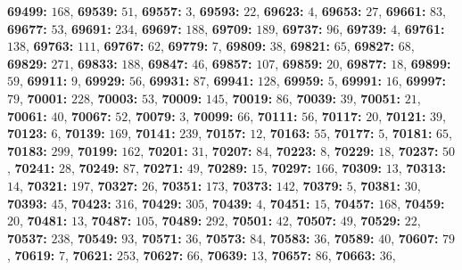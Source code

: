 \textsf{\bfseries 69499:} $168$, \textsf{\bfseries 69539:} $51$, \textsf{\bfseries 69557:} $3$, \textsf{\bfseries 69593:} $22$, \textsf{\bfseries 69623:} $4$, \textsf{\bfseries 69653:} $27$, \textsf{\bfseries 69661:} $83$, \textsf{\bfseries 69677:} $53$, \textsf{\bfseries 69691:} $234$, \textsf{\bfseries 69697:} $188$, \textsf{\bfseries 69709:} $189$, \textsf{\bfseries 69737:} $96$, \textsf{\bfseries 69739:} $4$, \textsf{\bfseries 69761:} $138$, \textsf{\bfseries 69763:} $111$, \textsf{\bfseries 69767:} $62$, \textsf{\bfseries 69779:} $7$, \textsf{\bfseries 69809:} $38$, \textsf{\bfseries 69821:} $65$, \textsf{\bfseries 69827:} $68$, \textsf{\bfseries 69829:} $271$, \textsf{\bfseries 69833:} $188$, \textsf{\bfseries 69847:} $46$, \textsf{\bfseries 69857:} $107$, \textsf{\bfseries 69859:} $20$, \textsf{\bfseries 69877:} $18$, \textsf{\bfseries 69899:} $59$, \textsf{\bfseries 69911:} $9$, \textsf{\bfseries 69929:} $56$, \textsf{\bfseries 69931:} $87$, \textsf{\bfseries 69941:} $128$, \textsf{\bfseries 69959:} $5$, \textsf{\bfseries 69991:} $16$, \textsf{\bfseries 69997:} $79$, \textsf{\bfseries 70001:} $228$, \textsf{\bfseries 70003:} $53$, \textsf{\bfseries 70009:} $145$, \textsf{\bfseries 70019:} $86$, \textsf{\bfseries 70039:} $39$, \textsf{\bfseries 70051:} $21$, \textsf{\bfseries 70061:} $40$, \textsf{\bfseries 70067:} $52$, \textsf{\bfseries 70079:} $3$, \textsf{\bfseries 70099:} $66$, \textsf{\bfseries 70111:} $56$, \textsf{\bfseries 70117:} $20$, \textsf{\bfseries 70121:} $39$, \textsf{\bfseries 70123:} $6$, \textsf{\bfseries 70139:} $169$, \textsf{\bfseries 70141:} $239$, \textsf{\bfseries 70157:} $12$, \textsf{\bfseries 70163:} $55$, \textsf{\bfseries 70177:} $5$, \textsf{\bfseries 70181:} $65$, \textsf{\bfseries 70183:} $299$, \textsf{\bfseries 70199:} $162$, \textsf{\bfseries 70201:} $31$, \textsf{\bfseries 70207:} $84$, \textsf{\bfseries 70223:} $8$, \textsf{\bfseries 70229:} $18$, \textsf{\bfseries 70237:} $50$, \textsf{\bfseries 70241:} $28$, \textsf{\bfseries 70249:} $87$, \textsf{\bfseries 70271:} $49$, \textsf{\bfseries 70289:} $15$, \textsf{\bfseries 70297:} $166$, \textsf{\bfseries 70309:} $13$, \textsf{\bfseries 70313:} $14$, \textsf{\bfseries 70321:} $197$, \textsf{\bfseries 70327:} $26$, \textsf{\bfseries 70351:} $173$, \textsf{\bfseries 70373:} $142$, \textsf{\bfseries 70379:} $5$, \textsf{\bfseries 70381:} $30$, \textsf{\bfseries 70393:} $45$, \textsf{\bfseries 70423:} $316$, \textsf{\bfseries 70429:} $305$, \textsf{\bfseries 70439:} $4$, \textsf{\bfseries 70451:} $15$, \textsf{\bfseries 70457:} $168$, \textsf{\bfseries 70459:} $20$, \textsf{\bfseries 70481:} $13$, \textsf{\bfseries 70487:} $105$, \textsf{\bfseries 70489:} $292$, \textsf{\bfseries 70501:} $42$, \textsf{\bfseries 70507:} $49$, \textsf{\bfseries 70529:} $22$, \textsf{\bfseries 70537:} $238$, \textsf{\bfseries 70549:} $93$, \textsf{\bfseries 70571:} $36$, \textsf{\bfseries 70573:} $84$, \textsf{\bfseries 70583:} $36$, \textsf{\bfseries 70589:} $40$, \textsf{\bfseries 70607:} $79$, \textsf{\bfseries 70619:} $7$, \textsf{\bfseries 70621:} $253$, \textsf{\bfseries 70627:} $66$, \textsf{\bfseries 70639:} $13$, \textsf{\bfseries 70657:} $86$, \textsf{\bfseries 70663:} $36$, 
